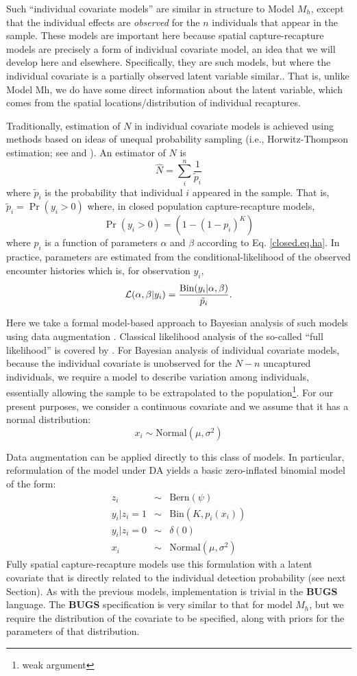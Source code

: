 Such ``individual covariate models'' are similar in structure to Model
$M_{h}$, except that the individual effects are {\it observed} for the
$n$ individuals that appear in the sample. These models are important
here because spatial capture-recapture models are precisely a form of
individual covariate model, an idea that we will develop here and
elsewhere. Specifically, they are such models, but where the
individual covariate is a partially observed latent variable similar..
That is, unlike Model Mh, we do have some direct information about the
latent variable, which comes from the spatial locations/distribution
of individual recaptures.

Traditionally, estimation of $N$ in individual covariate models is
achieved using methods based on ideas of unequal probability sampling
(i.e., Horwitz-Thompson estimation; see \citet{huggins:1989} and
\citet{alho:1990}). An estimator of $N$ is
\[
\hat{N} = \sum_{i}^{n} \frac{1}{\tilde{p}_{i}}
\]
where $\tilde{p}_{i}$ is the probability that individual $i$ appeared
in the sample.  That is, $\tilde{p}_{i} = \Pr(y_{i}>0)$
where, in closed population capture-recapture models, 
\[
\Pr(y_{i}>0) = (1- (1-p_{i})^K)
\]
where $p_{i}$ is a function of parameters $\alpha$ and $\beta$
according to
Eq. \ref{closed.eq.ha}.
In practice, parameters are estimated 
from the conditional-likelihood of the observed encounter histories
which is, for observation $y_{i}$, 
\[
{\cal L}(\alpha, \beta | y_{i}) = \frac{ \mbox{Bin}(y_{i}|\alpha,\beta) } { \tilde{p}_{i}}.
\]

Here we take a formal model-based approach to Bayesian analysis of
such models using data augmentation \citep{royle:2009}. Classical
likelihood analysis of the so-called ``full likelihood'' is covered 
 by \citet{borchers_etal:2002}.  For Bayesian analysis of
individual covariate models, because the individual covariate is
unobserved for the $N-n$ uncaptured individuals, we require a model to
describe variation among individuals, essentially allowing the sample
to be extrapolated to the population\footnote{weak argument}.  For our present purposes, we
consider a continuous covariate and we assume that it has a normal
distribution:
\[
x_{i} \sim \mbox{Normal}(\mu,\sigma^{2})
\]

Data augmentation can be applied directly to this class of models. In
particular, reformulation of the model under DA yields a basic
zero-inflated binomial model of the form:
\begin{eqnarray*}
z_{i} &\sim& \mbox{Bern}(\psi) \\
y_{i}|{z_{i}\! =\! 1} &\sim& \mbox{Bin}(K,p_{i}(x_{i})) \\
y_{i} |{ z_{i}\! =\! 0} &\sim& \delta(0)  \\
x_{i} & \sim & \mbox{Normal}(\mu,\sigma^{2})
\end{eqnarray*}
Fully spatial capture-recapture models use this
formulation with a latent covariate that is directly related to the
individual detection probability (see next Section). As with the
previous models, implementation is trivial in the {\bf BUGS} language. The
{\bf BUGS} specification is very similar to that for model $M_h$, but we
require the distribution of the covariate to be specified, along with
priors for the parameters of that distribution.


